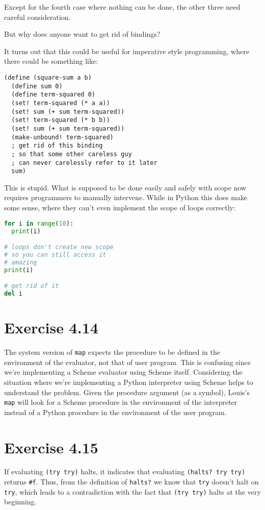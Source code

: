 \documentclass[../main.tex]{subfiles}
\begin{document}
Except for the fourth case where nothing can be done, the other three
need careful consideration.

But why does anyone want to get rid of bindings?

It turns out that this could be useful for imperative style programming,
where there could be something like:

\begin{lstlisting}
(define (square-sum a b)
  (define sum 0)
  (define term-squared 0)
  (set! term-squared (* a a))
  (set! sum (+ sum term-squared))
  (set! term-squared (* b b))
  (set! sum (+ sum term-squared))
  (make-unbound! term-squared)
  ; get rid of this binding
  ; so that some other careless guy
  ; can never carelessly refer to it later
  sum)
\end{lstlisting}

This is stupid. What is supposed to be done easily and safely with
scope now requires programmers to manually intervene. While in Python
this does make some sense, where they can't even implement the scope
of loops correctly:

\begin{lstlisting}[language=Python]
for i in range(10):
  print(i)

# loops don't create new scope
# so you can still access it
# amazing
print(i)

# get rid of it
del i
\end{lstlisting}

\section{Exercise 4.14}

The system version of \lstinline{map} expects the procedure to be
defined in the environment of the evaluator, not that of user program.
This is confusing since we're implementing a Scheme evaluator using
Scheme itself. Considering the situation where we're implementing a Python
interpreter using Scheme helps to understand the problem. Given the
procedure argument (as a symbol), Louis's \lstinline{map} will look for
a Scheme procedure in the environment of the interpreter instead of a
Python procedure in the environment of the user program.

\section{Exercise 4.15}

If evaluating \lstinline{(try try)} halts, it indicates that evaluating
\lstinline{(halts? try try)} returns \lstinline{#f}. Thus, from the
definition of \lstinline{halts?} we know that \lstinline{try} doesn't
halt on \lstinline{try}, which leads to a contradiction with the fact
that \lstinline{(try try)} halts at the very beginning.
\end{document}
